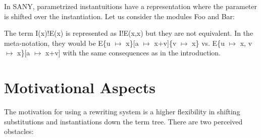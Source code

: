 \documentclass[a4paper]{article}
\newcommand{\tla}[1]{#1}
\theoremstyle{definition}
\begin{document}
In SANY, parametrized instantuitions have a representation where the
parameter is shifted over the instantiation. Let us consider the
modules Foo and Bar:

\begin{parcolumns}{2}
\end{parcolumns}

The term \tla{I(x)!E(x)} is represented as \tla{I!E(x,x)} but they are
not equivalent. In the meta-notation, they would be
E\{u $\mapsto$ x\}[a $\mapsto$ x+v]\{v $\mapsto$ x\} vs. E\{u $\mapsto$ x,
v $\mapsto$ x\}[a $\mapsto$ x+v] with the same consequences as in the
introduction.

\vspace{2cm}

\newpage
\appendix
\section{Motivational Aspects}
The motivation for using a rewriting system is a higher flexibility in shifting
 substitutions and instantiations down the term tree. There are two perceived
 obstacles:
\end{document}
